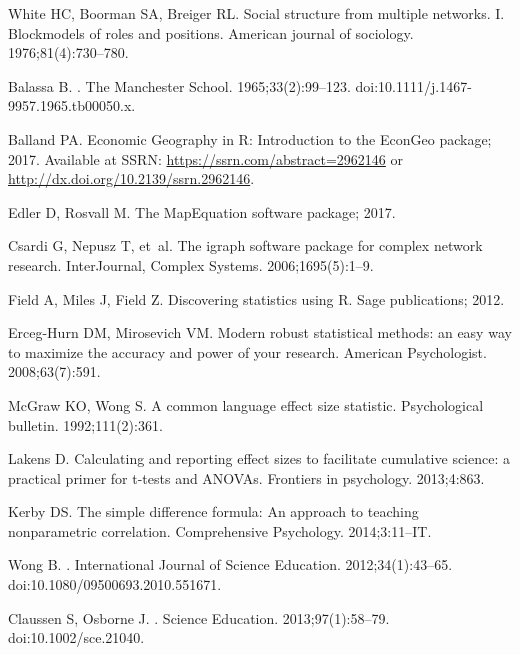 \begin{thebibliography}{10}
White HC, Boorman SA, Breiger RL.
\newblock Social structure from multiple networks. I. Blockmodels of roles and positions.
\newblock American journal of sociology. 1976;81(4):730--780.

Balassa B.
.
\newblock The Manchester School. 1965;33(2):99--123.
\newblock doi:{10.1111/j.1467-9957.1965.tb00050.x}.

Balland PA. Economic Geography in R: Introduction to the EconGeo package; 2017.
\newblock Available at SSRN: \url{https://ssrn.com/abstract=2962146} or
  \url{http://dx.doi.org/10.2139/ssrn.2962146}.

Edler D, Rosvall M. The MapEquation software package; 2017.

Csardi G, Nepusz T, et~al.
\newblock The igraph software package for complex network research.
\newblock InterJournal, Complex Systems. 2006;1695(5):1--9.

Field A, Miles J, Field Z.
\newblock Discovering statistics using R.
\newblock Sage publications; 2012.

Erceg-Hurn DM, Mirosevich VM.
\newblock Modern robust statistical methods: an easy way to maximize the accuracy and power of your research.
\newblock American Psychologist. 2008;63(7):591.

McGraw KO, Wong S.
\newblock A common language effect size statistic.
\newblock Psychological bulletin. 1992;111(2):361.

Lakens D.
\newblock Calculating and reporting effect sizes to facilitate cumulative science: a practical primer for t-tests and ANOVAs.
\newblock Frontiers in psychology. 2013;4:863.

Kerby DS.
\newblock The simple difference formula: An approach to teaching nonparametric correlation.
\newblock Comprehensive Psychology. 2014;3:11--IT.

Wong B.
.
\newblock International Journal of Science Education. 2012;34(1):43--65.
\newblock doi:{10.1080/09500693.2010.551671}.

Claussen S, Osborne J.
.
\newblock Science Education. 2013;97(1):58--79.
\newblock doi:{10.1002/sce.21040}.


\end{thebibliography}
